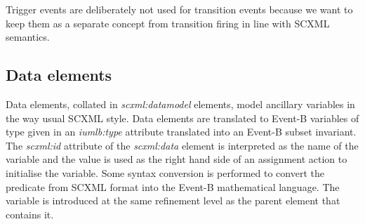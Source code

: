 Trigger events are deliberately not used for transition events because we 
want to keep them as a separate concept from transition firing in line 
with SCXML semantics.

\subsection{Data elements}
Data elements, collated in \emph{scxml:datamodel} elements, model ancillary 
variables in the way usual SCXML style. Data elements are translated to 
Event-B variables of type given in an \emph{iumlb:type} attribute translated 
into an Event-B subset invariant.  The \emph{scxml:id} attribute of the 
\emph{scxml:data} element is interpreted as the name of the variable and 
the value is used as the right hand side of an assignment action to initialise 
the variable.  Some syntax conversion is performed to convert the predicate from 
SCXML format into the Event-B mathematical language. The variable is introduced 
at the same refinement level as the parent element that contains it.


